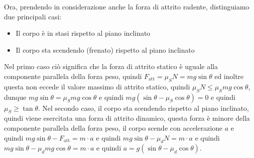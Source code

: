         Ora, prendendo in considerazione anche la forza di attrito radente, distinguiamo due principali casi:
        \begin{itemize}
            \item Il corpo è in stasi rispetto al piano inclinato
            \item Il corpo sta scendendo (frenato) rispetto al piano inclinato
        \end{itemize}
        Nel primo caso ciò significa che la forza di attrito statico è uguale alla componente parallela della forza peso, quindi $F_{\text{att}} = \mu_S N = mg\sin \theta$ ed inoltre questa non eccede il valore massimo di attrito statico, quindi $\mu_S N \leq \mu_S mg\cos \theta$, dunque $mg\sin \theta = \mu_S mg\cos \theta$ e quindi $ mg(\sin \theta - \mu_S \cos \theta) = 0$ e quindi $\mu_S \geq \tan \theta$.\newline
        Nel secondo caso, il corpo sta scendendo rispetto al piano inclinato, quindi viene esercitata una forza di attrito dinamico, questa forza è minore della componente parallela della forza peso, il corpo scende con accelerazione $a$ e quindi $mg\sin \theta - F_{\text{att}} = m\cdot a$ e quindi $mg\sin \theta - \mu_d N = m\cdot a$ e quindi $mg\sin \theta - \mu_d mg\cos \theta = m\cdot a$ e quindi $a = g(\sin \theta - \mu_d \cos \theta)$.

